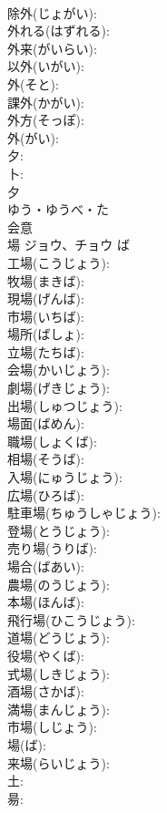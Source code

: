 \documentclass[8pt]{extreport}
\begin{document}
\begin{CJK}{UTF8}{min}
\\	除外(じょがい): 
\\	外れる(はずれる): 
\\	外来(がいらい): 
\\	以外(いがい): 
\\	外(そと): 
\\	課外(かがい): 
\\	外方(そっぽ): 
\\	外(がい): 
\\	夕: 
\\	卜: 
\\	夕	
\\	ゆう・ゆうべ・た	
\\	会意 
\\	場	ジョウ、チョウ	ば		
\\	工場(こうじょう): 
\\	牧場(まきば): 
\\	現場(げんば): 
\\	市場(いちば): 
\\	場所(ばしょ): 
\\	立場(たちば): 
\\	会場(かいじょう): 
\\	劇場(げきじょう): 
\\	出場(しゅつじょう): 
\\	場面(ばめん): 
\\	職場(しょくば): 
\\	相場(そうば): 
\\	入場(にゅうじょう): 
\\	広場(ひろば): 
\\	駐車場(ちゅうしゃじょう): 
\\	登場(とうじょう): 
\\	売り場(うりば): 
\\	場合(ばあい): 
\\	農場(のうじょう): 
\\	本場(ほんば): 
\\	飛行場(ひこうじょう): 
\\	道場(どうじょう): 
\\	役場(やくば): 
\\	式場(しきじょう): 
\\	酒場(さかば): 
\\	満場(まんじょう): 
\\	市場(しじょう): 
\\	場(ば): 
\\	来場(らいじょう): 
\\	土: 
\\	昜: 

\end{CJK}
\end{document}
